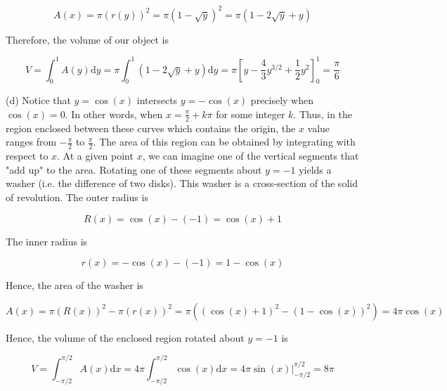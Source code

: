 \documentclass[10pt]{article}
\begin{document}
$$
A(x)=\pi(r(y))^{2}=\pi(1-\sqrt{y})^{2}=\pi(1-2 \sqrt{y}+y)
$$

Therefore, the volume of our object is

$$
V=\int_{0}^{1} A(y) \mathrm{d} y=\pi \int_{0}^{1}(1-2 \sqrt{y}+y) \mathrm{d} y=\pi\left[y-\frac{4}{3} y^{3 / 2}+\frac{1}{2} y^{2}\right]_{0}^{1}=\frac{\pi}{6}
$$

(d) Notice that $y=\cos (x)$ intersects $y=-\cos (x)$ precisely when $\cos (x)=0$. In other words, when $x=\frac{\pi}{2}+k \pi$ for some integer $k$. Thus, in the region enclosed between these curves which contains the origin, the $x$ value ranges from $-\frac{\pi}{2}$ to $\frac{\pi}{2}$. The area of this region can be obtained by integrating with respect to $x$. At a given point $x$, we can imagine one of the vertical segments that "add up" to the area. Rotating one of these segments about $y=-1$ yields a washer (i.e. the difference of two disks). This washer is a cross-section of the solid of revolution. The outer radius is

$$
R(x)=\cos (x)-(-1)=\cos (x)+1
$$

The inner radius is

$$
r(x)=-\cos (x)-(-1)=1-\cos (x)
$$

Hence, the area of the washer is

$$
A(x)=\pi(R(x))^{2}-\pi(r(x))^{2}=\pi\left((\cos (x)+1)^{2}-(1-\cos (x))^{2}\right)=4 \pi \cos (x)
$$

Hence, the volume of the enclosed region rotated about $y=-1$ is

$$
V=\int_{-\pi / 2}^{\pi / 2} A(x) \mathrm{d} x=4 \pi \int_{-\pi / 2}^{\pi / 2} \cos (x) \mathrm{d} x=\left.4 \pi \sin (x)\right|_{-\pi / 2} ^{\pi / 2}=8 \pi
$$
\end{document}
